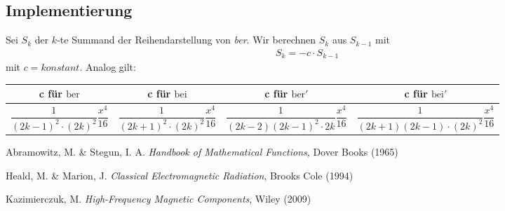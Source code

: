 \documentclass[10pt,a4paper]{article}
\begin{document}
\subsection{Implementierung}

Sei $S_k$ der $k$-te Summand der Reihendarstellung von \emph{ber}. Wir berechnen $S_k$ aus $S_{k-1}$ mit
\begin{align}
	S_k=-c\cdot S_{k-1}
\end{align} mit $c=konstant$.
Analog gilt:\newline
\begin{tabular}{c|c|c|c}
\centering
\rule[1ex]{0pt}{2.5ex} c für $\mathrm{ber}$ & c für $\mathrm{bei}$ & c für $\mathrm{ber}'$ & c für $\mathrm{bei}'$ \\ 
\hline 
\rule[2ex]{0pt}{2.5ex} $\dfrac{1}{(2k-1)^2\cdot(2k)^2}\dfrac{x^4}{16}$ & $\dfrac{1}{(2k+1)^2\cdot(2k)^2}\dfrac{x^4}{16}$ & $\dfrac{1}{(2k-2)(2k-1)^2\cdot 2k}\dfrac{x^4}{16}$ & $\dfrac{1}{(2k+1)(2k-1) \cdot (2k)^2}\dfrac{x^4}{16}$ \\ 
\end{tabular}
\begin{thebibliography}{9}

Abramowitz, M. \& Stegun, I. A.
\emph{Handbook of Mathematical Functions},
Dover Books (1965)

Heald, M. \& Marion, J.
\emph{Classical Electromagnetic Radiation},
Brooks Cole (1994)

Kazimierczuk, M.
\emph{High-Frequency Magnetic Components},
Wiley (2009)

\end{thebibliography}
\end{document}
